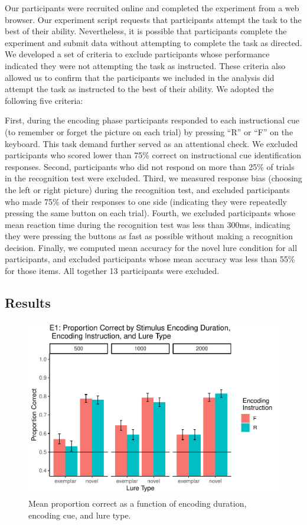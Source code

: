 \documentclass[
  english,
  man,floatsintext]{apa6}
\begin{document}
Our participants were recruited online and completed the experiment from a web browser. Our experiment script requests that participants attempt the task to the best of their ability. Nevertheless, it is possible that participants complete the experiment and submit data without attempting to complete the task as directed. We developed a set of criteria to exclude participants whose performance indicated they were not attempting the task as instructed. These criteria also allowed us to confirm that the participants we included in the analysis did attempt the task as instructed to the best of their ability. We adopted the following five criteria:

First, during the encoding phase participants responded to each instructional cue (to remember or forget the picture on each trial) by pressing \enquote{R} or \enquote{F} on the keyboard. This task demand further served as an attentional check. We excluded participants who scored lower than 75\% correct on instructional cue identification responses. Second, participants who did not respond on more than 25\% of trials in the recognition test were excluded. Third, we measured response bias (choosing the left or right picture) during the recognition test, and excluded participants who made 75\% of their responses to one side (indicating they were repeatedly pressing the same button on each trial). Fourth, we excluded participants whose mean reaction time during the recognition test was less than 300ms, indicating they were pressing the buttons as fast as possible without making a recognition decision. Finally, we computed mean accuracy for the novel lure condition for all participants, and excluded participants whose mean accuracy was less than 55\% for those items. All together 13 participants were excluded.

\hypertarget{results}{%
\subsection{Results}\label{results}}

\begin{figure}
\centering
\includegraphics{honorsThesis_NEW_files/figure-latex/e1fig-1.pdf}
\caption{\label{fig:e1fig}Mean proportion correct as a function of encoding duration, encoding cue, and lure type.}
\end{figure}
\end{document}
